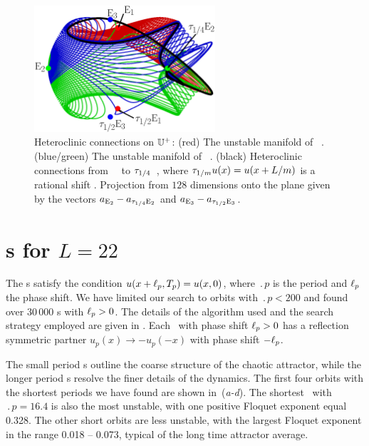 \begin{figure}[t]
\begin{center}
        \includegraphics[width=0.6\textwidth, clip=true]{figs/KS22hetero.eps}
\end{center}
\caption{ Heteroclinic connections on $\mathbb{U}^+$:
 (red) The unstable manifold of ~\eqv.
 (blue/green) The unstable manifold of ~\eqv.
 (black) Heteroclinic connections from ~\eqv\ to $\tau_{1/4}$~\eqv,
 where $ \tau_{1/m}u(x)=u(x+L/m)$ is a rational shift .
 Projection from $128$ dimensions onto the plane given by the vectors
 $a_{\mathrm{E}_{2}}-a_{\tau_{1/4}\mathrm{E}_{2}}$ and $a_{\mathrm{E}_{3}}-a_{\tau_{1/2}\mathrm{E}_{3}}$.}
\label{f:KS22hetero}
\end{figure}



\section{\Rpo s for $L=22$}
\label{sec:rpos}

The \rpo s satisfy the condition 
$u(x+\ell_p,{T_{p}}) = u(x,0)$,
where $\period{p}$ is the period and $\ell_p$ the phase shift.
We have limited our search to orbits with $\period{p} < 200$ and found
over 30\,000 \rpo s with $\ell_p > 0$.  The details of the algorithm
used and the search strategy employed are given in
.
Each \rpo\ with phase shift
$\ell_p > 0$ has a reflection symmetric partner
$u_p(x) \to -u_p(-x)$ with phase shift $-\ell_p$.

The small period \rpo s outline the coarse structure of the chaotic
attractor, while the longer period \rpo s resolve the finer details
of the dynamics.
The first four orbits with the shortest periods we have found are
shown in \,(\textit{a-d}).  The shortest \rpo\ with
$\period{p} = 16.4$ is also the most unstable, with one positive
Floquet exponent equal 0.328.  The other short orbits are less
unstable, with the largest Floquet exponent in the range
0.018 -- 0.073, typical of the long time attractor average.

